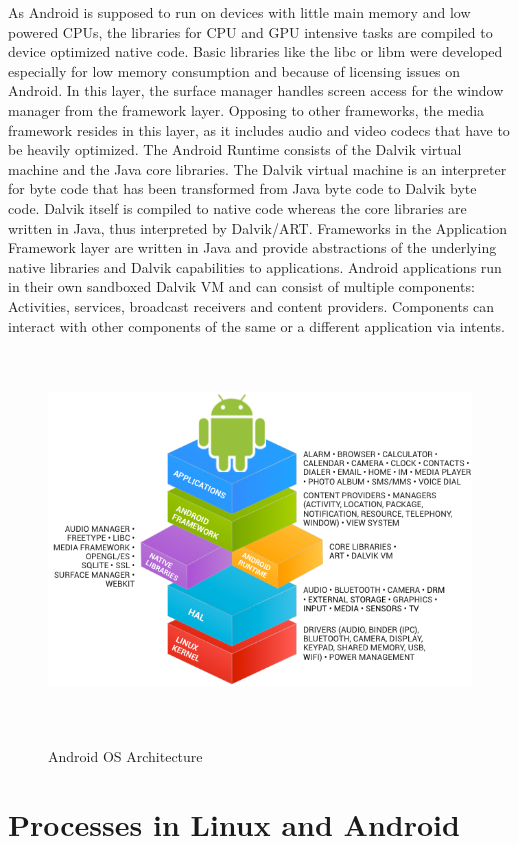 \documentclass[12pt]{report}
\begin{document}
As Android is supposed to run on devices with little main memory and low powered CPUs, the libraries for CPU and GPU intensive tasks are compiled to
device optimized native code. Basic libraries like the libc or libm were developed
especially for low memory consumption and because of licensing issues on Android.
In this layer, the surface manager handles screen access for the window manager
from the framework layer. Opposing to other frameworks, the media framework
resides in this layer, as it includes audio and video codecs that have to be heavily
optimized.
The Android Runtime consists of the Dalvik virtual machine and the Java core
libraries. The Dalvik virtual machine is an interpreter for byte code that has been
transformed from Java byte code to Dalvik byte code. Dalvik itself is compiled to
native code whereas the core libraries are written in Java, thus interpreted by
Dalvik/ART.
Frameworks in the Application Framework layer are written in Java and provide  abstractions  of  the  underlying  native  libraries  and  Dalvik  capabilities  to
applications.  Android applications run in their own sandboxed Dalvik VM and
can consist of multiple components: Activities, services, broadcast receivers and
content providers. Components can interact with other components of the same or
a different application via intents.
\begin{figure}[H]
	\centering
	\includegraphics[width=1.0\textwidth,height=10cm]{2}
	\citep{androiddiagram}
	\caption{Android OS Architecture}
	\label{2}
\end{figure}
\section{Processes in Linux and Android}
\end{document}
